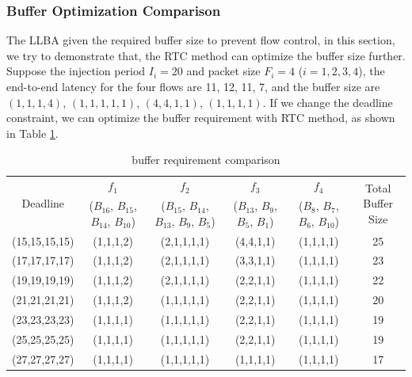 \documentclass[10pt,journal]{IEEEtran}
\begin{document}
\subsubsection{Buffer Optimization Comparison}
The LLBA \cite{189} given the required buffer size to prevent flow control, in this section, we try to demonstrate that, the RTC method can optimize the buffer size further. Suppose the injection period $I_i=20$ and packet size $F_i=4$ ($i=1,2,3,4$), the end-to-end latency for the four flows are 11, 12, 11, 7, and the buffer size are $(1,1,1,4)$, $(1,1,1,1,1)$, $(4,4,1,1)$, $(1,1,1,1)$. If we change the deadline constraint, we can optimize the buffer requirement with RTC method, as shown in Table \ref{LLBAvsRTC}.
\begin{table}[htbp]
\centering
\caption{\label{LLBAvsRTC}buffer requirement comparison}
\begin{tabular}{|c|c|c|c|c|c|}
\hline
\multirow{2}{*}{Deadline}  & $f_1$  &   $f_2$   &   $f_3$   &   $f_4$   &   \multirow{2}{*}{Total Buffer Size} \\
($D_1$, $D_2$, $D_3$, $D_4$)    &   ($B_{16}$, $B_{15}$, $B_{14}$, $B_{10}$)  &   ($B_{15}$, $B_{14}$, $B_{13}$, $B_{9}$, $B_5$)  & ($B_{13}$, $B_{9}$, $B_{5}$, $B_{1}$)   &    ($B_{8}$, $B_{7}$, $B_{6}$, $B_{10}$)   &   \\
\hline
(15,15,15,15)   &   (1,1,1,2)   &   (2,1,1,1,1) &   (4,4,1,1)   &   (1,1,1,1)   &   25\\
\hline
(17,17,17,17)   &   (1,1,1,2)   &   (2,1,1,1,1) &   (3,3,1,1)   &   (1,1,1,1)   &   23\\
\hline
(19,19,19,19)   &   (1,1,1,2)   &   (2,1,1,1,1) &   (2,2,1,1)   &   (1,1,1,1)   &   22\\
\hline
(21,21,21,21)   &   (1,1,1,2)   &   (1,1,1,1,1) &   (2,2,1,1)   &   (1,1,1,1)   &   20\\
\hline
(23,23,23,23)   &   (1,1,1,1)   &   (1,1,1,1,1) &   (2,2,1,1)   &   (1,1,1,1)   &   19\\
\hline
(25,25,25,25)   &   (1,1,1,1)   &   (1,1,1,1,1) &   (2,2,1,1)   &   (1,1,1,1)   &   19\\
\hline
(27,27,27,27)   &   (1,1,1,1)   &   (1,1,1,1,1) &   (1,1,1,1)   &   (1,1,1,1)   &   17\\
\hline
\end{tabular}
\end{table}
\end{document}
